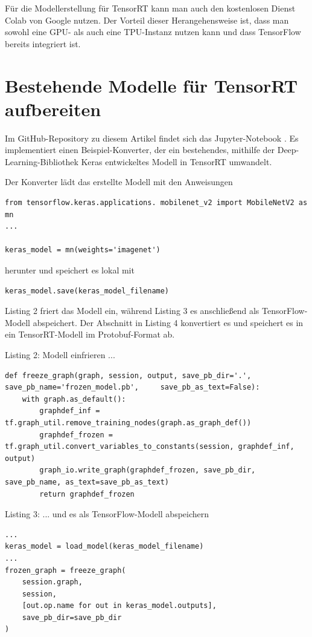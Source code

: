 Für die Modellerstellung für TensorRT kann man auch den kostenlosen Dienst Colab von Google nutzen. Der Vorteil dieser Herangehensweise ist, dass man sowohl eine GPU- als auch eine TPU-Instanz nutzen kann und dass TensorFlow bereits integriert ist. 

\section{Bestehende Modelle für TensorRT aufbereiten}\label{todoTensorRT2}


Im GitHub-Repository zu diesem Artikel findet sich das Jupyter-Notebook . Es implementiert einen Beispiel-Konverter, der ein bestehendes, mithilfe der Deep-Learning-­Bibliothek Keras entwickeltes Modell in TensorRT umwandelt. 

Der Konverter lädt das erstellte Modell mit den Anweisungen  

\begin{lstlisting}
from tensorflow.keras.applications. mobilenet_v2 import MobileNetV2 as mn
...

keras_model = mn(weights='imagenet')
\end{lstlisting}


herunter und speichert es lokal mit 

\begin{lstlisting}
keras_model.save(keras_model_filename)
\end{lstlisting}

Listing 2 friert das Modell ein, während Listing 3 es anschließend als TensorFlow-Modell abspeichert. Der Abschnitt in Listing 4 konvertiert es und speichert es in ein TensorRT-Modell im Protobuf-­Format ab. 


\bigskip

Listing 2: Modell einfrieren ... 
\begin{lstlisting}
def freeze_graph(graph, session, output, save_pb_dir='.', save_pb_name='frozen_model.pb',     save_pb_as_text=False):
    with graph.as_default():
        graphdef_inf = tf.graph_util.remove_training_nodes(graph.as_graph_def())
        graphdef_frozen = tf.graph_util.convert_variables_to_constants(session, graphdef_inf, output)
        graph_io.write_graph(graphdef_frozen, save_pb_dir, save_pb_name, as_text=save_pb_as_text)
        return graphdef_frozen
\end{lstlisting}

\bigskip


Listing 3: ... und es als TensorFlow-Modell abspeichern 
\begin{lstlisting}
...
keras_model = load_model(keras_model_filename)
...
frozen_graph = freeze_graph(
    session.graph, 
    session, 
    [out.op.name for out in keras_model.outputs], 
    save_pb_dir=save_pb_dir
)
\end{lstlisting}



